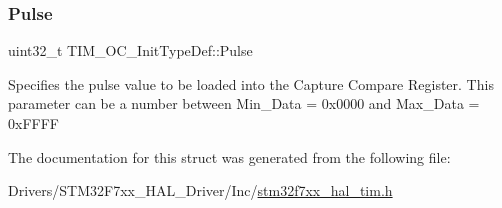 \subsubsection{\texorpdfstring{Pulse}{Pulse}}
{\footnotesize\ttfamily uint32\+\_\+t T\+I\+M\+\_\+\+O\+C\+\_\+\+Init\+Type\+Def\+::\+Pulse}

Specifies the pulse value to be loaded into the Capture Compare Register. This parameter can be a number between Min\+\_\+\+Data = 0x0000 and Max\+\_\+\+Data = 0x\+F\+F\+FF 

The documentation for this struct was generated from the following file\+:\begin{DoxyCompactItemize}
\item 
Drivers/\+S\+T\+M32\+F7xx\+\_\+\+H\+A\+L\+\_\+\+Driver/\+Inc/\mbox{\hyperlink{stm32f7xx__hal__tim_8h}{stm32f7xx\+\_\+hal\+\_\+tim.\+h}}\end{DoxyCompactItemize}
